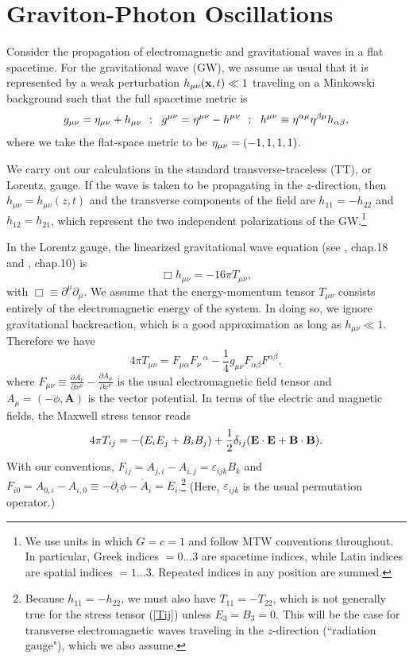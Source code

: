 \documentclass[12pt]{article}
\let\a=\alpha \let\b=\beta  \let\g=\gamma  \let\d=\delta \let\e=\varepsilon
\let\m=\mu    \let\n=\nu    \let\x=\xi     \let\p=\pi    \let\r=\rho
\let\dpr=\partial \def\der{{\rm d}} \let\circa=\cong
\def\be{\begin{equation}}
\def\ee{\end{equation}}
\begin{document}
\section{Graviton-Photon Oscillations}
\setcounter{equation}{0}\label{sec2}
Consider the propagation of electromagnetic and gravitational waves in a flat spacetime.  For the gravitational wave (GW),  we assume as usual that it is represented by a weak perturbation $h_{\m\n}({\bf x}, t) \ll 1$ traveling on a Minkowski background such that the full spacetime metric is
\be
g_{\m\n} = \eta_{\m\n} + h_{\m\n} \ \ ;\ \  g^{\m\n} = \eta^{\m\n} - h^{\m\n}\ \ ;\ \   h^{\m\n} \equiv
\h^{\a\m}\h^{\b\m}h_{\a\b}, \label{gmunu}
\ee
where we take the flat-space metric to be $\h_{\m\n} = (-1,1,1,1)$.

We carry out our calculations in the standard transverse-traceless (TT), or Lorentz, gauge. If the wave is taken to be propagating in the $z$-direction, then $h_{\m\n} = h_{\m\n}(z,t)$ and the transverse components of the field are $h_{11} = -h_{22}$ and $h_{12} = h_{21}$, which represent the two independent polarizations of the GW.\footnote{We use units in which $G = c = 1$ and follow MTW \cite{MTW73} conventions throughout. In particular, Greek indices $= 0...3$ are spacetime indices, while Latin indices are spatial indices $= 1...3$. Repeated indices in any position are summed.}

In the Lorentz gauge, the linearized gravitational wave equation (see \cite{MTW73}, chap.18 and \cite{Weinberg72}, chap.10) is
\be
\Box h_{\mu\nu} = -16\pi T_{\mu \nu},\label{boxh}
\ee
with $\Box \equiv \dpr^\m \dpr_\m$. We assume that the energy-momentum tensor $T_{\m\n}$ consists entirely of the electromagnetic energy of the system. In doing so, we ignore gravitational backreaction, which is a good approximation as long as $h_{\m \n} \ll 1$. Therefore we have
\be
4\pi T_{\m\n} = F_{\m\a}F_\n\,^\a -\frac1{4}g_{\m\n}F_{\a\b}F^{\a\b}, \label{Tuv}
\ee
where $F_{\m\n} \equiv  \frac{\dpr A_\n}{\dpr x^\m} - \frac{\dpr A_\m}{\dpr x^\n}$ is the usual electromagnetic field tensor and $A_\m = (-\phi, \textbf{A})$ is the  vector potential. In terms of the electric and magnetic fields, the Maxwell stress tensor reads
\be
4\pi T_{ij}= -(E_iE_j + B_iB_j)+\frac1{2}\d_{ij}(\bf E \cdot E + B \cdot B).\label{Tij}
\ee
With our conventions, $F_{ij} = A_{j,i} - A_{i,j} = \e_{ijk}B_k$ and $F_{i0} = A_{0,i} - A_{i,0} \equiv - \partial_i \phi - \dot{A}_i = E_i$.\footnote{Because $h_{11} = -h_{22}$, we must also have $T_{11} = -T_{22}$, which is not generally true  for the stress tensor (\ref{Tij}) unless $E_3 = B_3 = 0$. This will be the case for transverse electromagnetic waves traveling in the $z$-direction (``radiation gauge"), which we also assume.} (Here, $\e_{ijk}$ is the usual permutation operator.)
\end{document}
